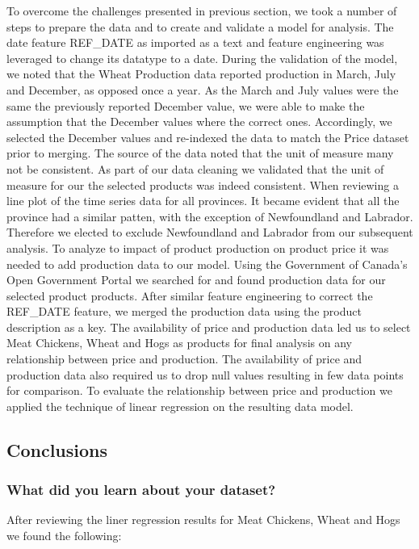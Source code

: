 To overcome the challenges presented in previous section, we took a number of steps to prepare the data and to create and validate a model for analysis.  
The date feature REF\_DATE as imported as a text and feature engineering was leveraged to change its datatype to a date.
During the validation of the model, we noted that the Wheat Production data reported production in March, July and December, as opposed once a year.
As the March and July values were the same the previously reported December value, we were able to make the assumption that the December values where the correct ones.
Accordingly, we selected the December values and re-indexed the data to match the Price dataset prior to merging.
The source of the data noted that the unit of measure many not be consistent.
As part of our data cleaning we validated that the unit of measure for our the selected products was indeed consistent.
When reviewing a line plot of the time series data for all provinces.
It became evident that all the province had a similar patten, with the exception of Newfoundland and Labrador.
Therefore we elected to exclude Newfoundland and Labrador from our subsequent analysis.
To analyze to impact of product production on product price it was needed to add production data to our model.
Using the Government of Canada's Open Government Portal we searched for and found production data for our selected product products.
After similar feature engineering to correct the REF\_DATE feature, we merged the production data using the product description as a key.
The availability of price and production data led us to select Meat Chickens, Wheat and Hogs as products for final analysis on any relationship between price and production.
The availability of price and production data also required us to drop null values resulting in few data points for comparison.
To evaluate the relationship between price and production we applied the technique of linear regression on the resulting data model.

\subsection{Conclusions}

\subsubsection{What did you learn about your dataset?}

After reviewing the liner regression results for Meat Chickens, Wheat and Hogs we found the following:

